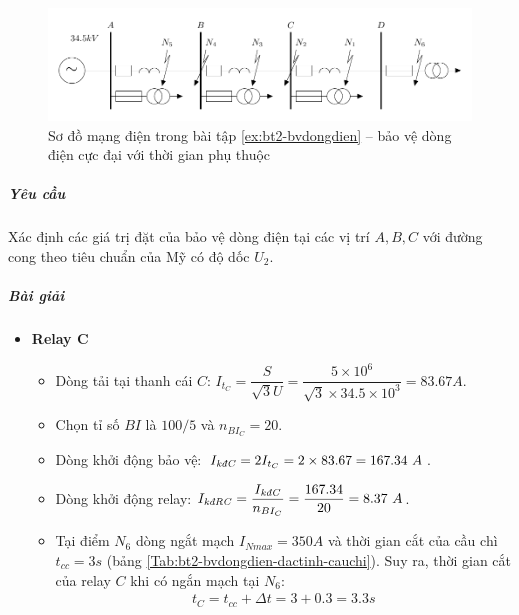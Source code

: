 \documentclass[12pt,a4paper]{article}
\begin{document}
\begin{enumerate}[1.]
			\begin{figure}[!h]
				\begin{center}
					\includegraphics[scale=1]{diagram-draw-tikz/Figure-baitap-baovedongdien-bt2.pdf} 				
				\end{center}
				\vspace{-.5cm}
				\caption{Sơ đồ mạng điện trong bài tập \ref{ex:bt2-bvdongdien} -- bảo vệ dòng điện cực đại với thời gian phụ thuộc} \label{Fig:bt2-bvdongdien}
				\vspace{-.5cm}
			\end{figure}
			
			\subparagraph{Yêu cầu} Xác định các giá trị đặt của bảo vệ dòng điện tại các vị trí $A, B, C$ với đường cong theo tiêu chuẩn của Mỹ có độ dốc $U_2$.
			
			\subparagraph{Bài giải}
				\begin{itemize}
					\item \textbf{Relay C}
						\begin{itemize}
							\item Dòng tải tại thanh cái $C$: $I_{t_C} = \dfrac{S}{\sqrt{3} U} = \dfrac{5 \times 10^6}{\sqrt{3} \times 34.5 \times 10^3} = 83.67 \unit{A}$.
							
							\item Chọn tỉ số $BI$ là $100/5$ và $n_{BI_C} = 20$.
							
							\item Dòng khởi động bảo vệ: $I_{\text{\textit{kđC}}} = 2 I_{t_C} = 2 \times 83.67 = 167.34 ~A$.
							
							\item Dòng khởi động relay: $I_{\text{\textit{kđRC}}} = \dfrac{I_{\text{\textit{kđC}}}}{n_{BI_C}} = \dfrac{167.34}{20} = 8.37 ~A$.
							
							\item Tại điểm $N_6$ dòng ngắt mạch $I_{Nmax} = 350 \unit{A}$ và thời gian cắt của cầu chì $t_{cc} = 3 \unit{s}$ (bảng \ref{Tab:bt2-bvdongdien-dactinh-cauchi}). Suy ra, thời gian cắt của relay $C$ khi có ngắn mạch tại $N_6$:
								\begin{align*}
									t_C = t_{cc} + \Delta t = 3 + 0.3 = 3.3 \unit{s}
								\end{align*}
								

\end{itemize}
\end{itemize}
\end{enumerate}
\end{document}
